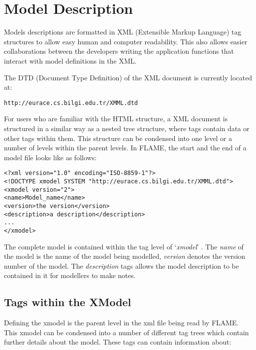 \section{Model Description}
\label{model_description}

Models descriptions are formatted in XML (Extensible Markup Language) tag
structures to allow easy human and computer readability. This also allows easier collaborations between the
developers writing the application functions that interact with model definitions in the XML.

The DTD (Document Type Definition) of the XML document is currently located
at:

\begin{mylisting}
\begin{verbatim}
http://eurace.cs.bilgi.edu.tr/XMML.dtd
\end{verbatim}
\end{mylisting}

For users who are familiar with the HTML structure, a XML document is structured in
a similar way as a nested tree structure, where tags contain data or other tags within them.
This structure can be condensed into one level or a number of levels within the parent levels.
In FLAME, the start and the end of a model file looks like as follows:

\begin{mylisting}
\begin{verbatim}
<?xml version="1.0" encoding="ISO-8859-1"?>
<!DOCTYPE xmodel SYSTEM "http://eurace.cs.bilgi.edu.tr/XMML.dtd">
<xmodel version="2">
<name>Model_name</name>
<version>the version</version>
<description>a description</description>
...
</xmodel>
\end{verbatim}
\end{mylisting}

The complete model is contained within the tag level of
`\emph{xmodel}' . The \emph{name} of the model is the name of the
model being modelled, \emph{version} denotes the version number of
the model. The \emph{description} tags allows the model description
to be contained in it for modellers to make notes.

\subsection{Tags within the XModel}
Defining the xmodel is the parent level in the xml file being read by FLAME. This xmodel can be condensed into a number of different tag trees which contain further details about the model. These tags can contain information about:

